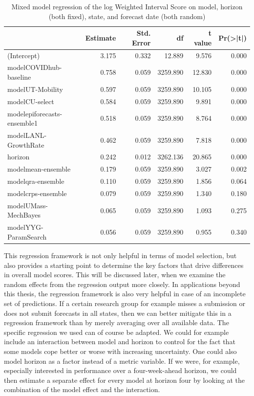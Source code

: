 \documentclass[
]{book}
\begin{document}
\begin{table}

\caption{\label{tab:random-effects-model}Mixed model regression of the log Weighted Interval Score on model, horizon (both fixed), state, and forecast date (both random)}
\centering
\begin{tabular}[t]{lrrrrr}
\toprule
  & Estimate & Std. Error & df & t value & Pr(>|t|)\\
\midrule
(Intercept) & 3.175 & 0.332 & 12.889 & 9.576 & 0.000\\
modelCOVIDhub-baseline & 0.758 & 0.059 & 3259.890 & 12.830 & 0.000\\
modelUT-Mobility & 0.597 & 0.059 & 3259.890 & 10.105 & 0.000\\
modelCU-select & 0.584 & 0.059 & 3259.890 & 9.891 & 0.000\\
modelepiforecasts-ensemble1 & 0.518 & 0.059 & 3259.890 & 8.764 & 0.000\\
modelLANL-GrowthRate & 0.462 & 0.059 & 3259.890 & 7.818 & 0.000\\
horizon & 0.242 & 0.012 & 3262.136 & 20.865 & 0.000\\
modelmean-ensemble & 0.179 & 0.059 & 3259.890 & 3.027 & 0.002\\
modelqra-ensemble & 0.110 & 0.059 & 3259.890 & 1.856 & 0.064\\
modelcrps-ensemble & 0.079 & 0.059 & 3259.890 & 1.340 & 0.180\\
modelUMass-MechBayes & 0.065 & 0.059 & 3259.890 & 1.093 & 0.275\\
modelYYG-ParamSearch & 0.056 & 0.059 & 3259.890 & 0.955 & 0.340\\
\bottomrule
\end{tabular}
\end{table}

This regression framework is not only helpful in terms of model selection, but also provides a starting point to determine the key factors that drive differences in overall model scores. This will be discussed later, when we examine the random effects from the regression output more closely. In applications beyond this thesis, the regression framework is also very helpful in case of an incomplete set of predictions. If a certain research group for example misses a submission or does not submit forecasts in all states, then we can better mitigate this in a regression framework than by merely averaging over all available data. The specific regression we used can of course be adapted. We could for example include an interaction between model and horizon to control for the fact that some models cope better or worse with increasing uncertainty. One could also model horizon as a factor instead of a metric variable. If we were, for example, especially interested in performance over a four-week-ahead horizon, we could then estimate a separate effect for every model at horizon four by looking at the combination of the model effect and the interaction.
\end{document}
